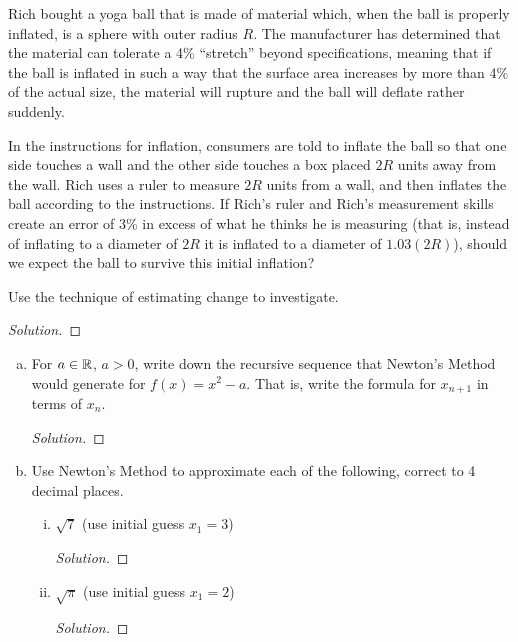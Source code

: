 \question Rich bought a yoga ball that is made of material which,
when the ball is properly inflated, is a sphere with outer radius $R$.
The manufacturer has determined that the material can tolerate a 4\% ``stretch'' beyond specifications,
meaning that if the ball is inflated in such a way that the surface area increases by more than 4\%
of the actual size, the material will rupture and the ball will deflate rather suddenly.

In the instructions for inflation, consumers are told to inflate the ball
so that one side touches a wall and the other side touches a box placed $2R$ units away from the wall.
Rich uses a ruler to measure $2R$ units from a wall, and then inflates the ball according to the instructions.
If Rich's ruler and Rich's measurement skills create an error of 3\% in excess of what he thinks he is measuring
(that is, instead of inflating to a diameter of $2R$ it is inflated to a diameter of $1.03(2R)$),
should we expect the ball to survive this initial inflation?

Use the technique of estimating change to investigate.

\begin{proof}[Solution]
\end{proof}


\question \begin{enumerate}[(a)]
  \item For $a\in\mathbb{R}$, $a > 0$, write down the recursive sequence that Newton's Method would generate for $f(x)=x^2-a$.
        That is, write the formula for $x_{n+1}$ in terms of $x_n$.
        \begin{proof}[Solution]
        \end{proof}
  \item Use Newton's Method to approximate each of the following, correct to 4 decimal places.
        \begin{enumerate}[(i)]
          \item $\sqrt{7}$ (use initial guess $x_1=3$)
                \begin{proof}[Solution]
                \end{proof}
          \item $\sqrt{\pi}$ (use initial guess $x_1=2$)
                \begin{proof}[Solution]
                \end{proof}
        \end{enumerate}
\end{enumerate}


